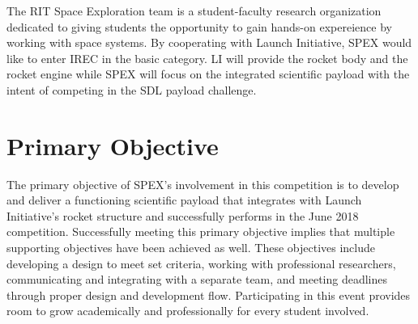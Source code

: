 \documentclass[conference]{IEEEtran} %
\begin{document}
The RIT Space Exploration team is a student-faculty research organization dedicated to giving students the opportunity to gain hands-on expereience by working with space systems.
By cooperating with Launch Initiative, SPEX would like to enter IREC in the basic category. LI will provide the rocket body and the rocket engine while SPEX will focus on the
integrated scientific payload with the intent of competing in the SDL payload challenge.

\section{Primary Objective}
\label{sec:Primary Objective}
The primary objective of SPEX's involvement in this competition is to develop and deliver a functioning scientific payload that integrates with Launch Initiative's rocket
structure and successfully performs in the June 2018 competition. Successfully meeting this primary objective implies
that multiple supporting objectives have been achieved as well. These objectives include developing a design to meet set criteria, working with
professional researchers, communicating and integrating with a separate team, and meeting deadlines through proper design and development flow. Participating
in this event provides room to grow academically and professionally for every student involved.


\end{document}
